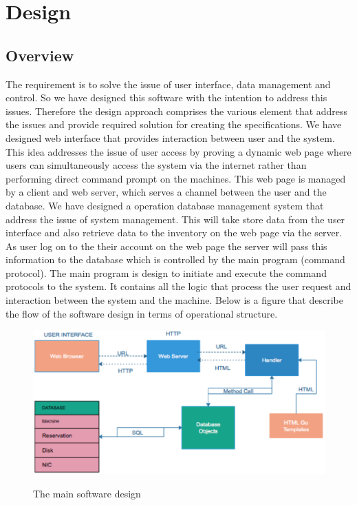\chapter{Design}
\label{chap:figtab}
\label{chap}
\section{Overview}

 The requirement is to solve the issue of user interface, data management and control. So we have designed this software with the intention to address this issues. Therefore the design approach comprises the various element that address the issues and provide required solution for creating the specifications. We have designed web interface that provides interaction between user and the system. This idea addresses the issue of user access by proving a dynamic web page where users can simultaneously access the system via the internet rather than performing direct command prompt on the machines. This web page is managed by a client and web server, which serves a channel between the user and the database. We have designed a operation database management system that address the issue of system management. This will take store data from the user interface and also retrieve data to the inventory on the web page via the server. As user log on to the their account on the web page the server will pass this information to the  database which is controlled by the main program (command protocol). The main program is design to initiate and execute the command protocols to the system. It contains all the logic that process the user request and interaction between the system and the machine. Below is a figure that describe the flow of the software design in terms of operational structure.
 
 \begin{figure}[h]
\includegraphics[width = \linewidth]{Design.eps}
\label{fig:Design structure}
\caption{The main software design}
\end{figure}

